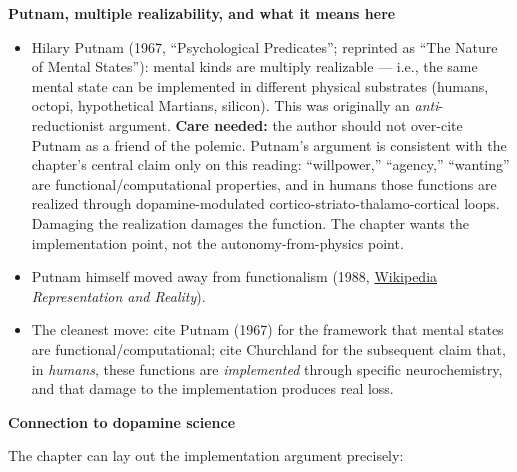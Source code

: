 \textbf{Putnam, multiple realizability, and what it means here}

\begin{itemize}
\tightlist
\item
  Hilary Putnam (1967, ``Psychological Predicates''; reprinted as ``The Nature of Mental States''): mental kinds are multiply realizable --- i.e., the same mental state can be implemented in different physical substrates (humans, octopi, hypothetical Martians, silicon). This was originally an \emph{anti}-reductionist argument. \textbf{Care needed:} the author should not over-cite Putnam as a friend of the polemic. Putnam's argument is consistent with the chapter's central claim only on this reading: ``willpower,'' ``agency,'' ``wanting'' are functional/computational properties, and in humans those functions are realized through dopamine-modulated cortico-striato-thalamo-cortical loops. Damaging the realization damages the function. The chapter wants the implementation point, not the autonomy-from-physics point.
\item
  Putnam himself moved away from functionalism (1988, \href{https://en.wikipedia.org/wiki/Hilary_Putnam}{Wikipedia} \emph{Representation and Reality}).
\item
  The cleanest move: cite Putnam (1967) for the framework that mental states are functional/computational; cite Churchland for the subsequent claim that, in \emph{humans}, these functions are \emph{implemented} through specific neurochemistry, and that damage to the implementation produces real loss.
\end{itemize}

\textbf{Connection to dopamine science}

The chapter can lay out the implementation argument precisely:

